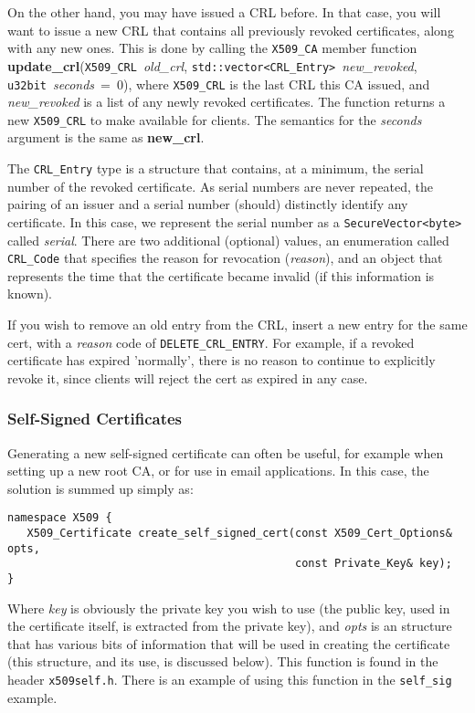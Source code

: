 \documentclass{article}
\newcommand{\filename}[1]{\texttt{#1}}
\newcommand{\function}[1]{\textbf{#1}}
\newcommand{\type}[1]{\texttt{#1}}
\renewcommand{\arg}[1]{\textsl{#1}}
\begin{document}
On the other hand, you may have issued a CRL before. In that case, you will
want to issue a new CRL that contains all previously revoked
certificates, along with any new ones. This is done by calling the
\type{X509\_CA} member function
\function{update\_crl}(\type{X509\_CRL}~\arg{old\_crl},
\type{std::vector<CRL\_Entry>}~\arg{new\_revoked},
\type{u32bit}~\arg{seconds}~=~0), where \type{X509\_CRL} is the last CRL this
CA issued, and \arg{new\_revoked} is a list of any newly revoked certificates.
The function returns a new \type{X509\_CRL} to make available for clients. The
semantics for the \arg{seconds} argument is the same as \function{new\_crl}.

The \type{CRL\_Entry} type is a structure that contains, at a minimum, the
serial number of the revoked certificate. As serial numbers are never repeated,
the pairing of an issuer and a serial number (should) distinctly identify any
certificate. In this case, we represent the serial number as a
\type{SecureVector<byte>} called \arg{serial}. There are two additional
(optional) values, an enumeration called \type{CRL\_Code} that specifies the
reason for revocation (\arg{reason}), and an object that represents the time
that the certificate became invalid (if this information is known).

If you wish to remove an old entry from the CRL, insert a new entry for the
same cert, with a \arg{reason} code of \type{DELETE\_CRL\_ENTRY}. For example,
if a revoked certificate has expired 'normally', there is no reason to continue
to explicitly revoke it, since clients will reject the cert as expired in any
case.

\subsubsection{Self-Signed Certificates}

Generating a new self-signed certificate can often be useful, for example when
setting up a new root CA, or for use in email applications. In this case,
the solution is summed up simply as:

\begin{verbatim}
namespace X509 {
   X509_Certificate create_self_signed_cert(const X509_Cert_Options& opts,
                                            const Private_Key& key);
}
\end{verbatim}

Where \arg{key} is obviously the private key you wish to use (the public key,
used in the certificate itself, is extracted from the private key), and
\arg{opts} is an structure that has various bits of information that will be
used in creating the certificate (this structure, and its use, is discussed
below). This function is found in the header \filename{x509self.h}. There is an
example of using this function in the \filename{self\_sig} example.
\end{document}
